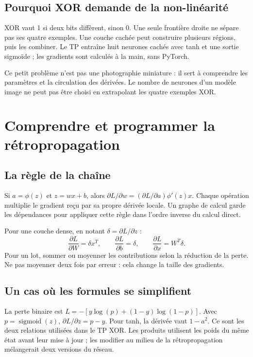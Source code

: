 \documentclass[12pt,a4paper,oneside]{report}
\begin{document}
\section{Pourquoi XOR demande de la non-linéarité}

XOR vaut 1 si deux bits diffèrent, sinon 0. Une seule frontière droite ne sépare
pas ses quatre exemples. Une couche cachée peut construire plusieurs régions,
puis les combiner. Le TP entraîne huit neurones cachés avec tanh et une sortie
sigmoïde ; les gradients sont calculés à la main, sans PyTorch.



Ce petit problème n'est pas une photographie miniature : il sert à comprendre
les paramètres et la circulation des dérivées. Le nombre de neurones d'un
modèle image ne peut pas être choisi en extrapolant les quatre exemples XOR.

\chapter{Comprendre et programmer la rétropropagation}

\section{La règle de la chaîne}

Si $a=\phi(z)$ et $z=wx+b$, alors
$\partial L/\partial w=(\partial L/\partial a)\phi'(z)x$.
Chaque opération multiplie le gradient reçu par sa propre dérivée locale.
Un graphe de calcul garde les dépendances pour appliquer cette règle dans
l'ordre inverse du calcul direct.

Pour une couche dense, en notant $\delta=\partial L/\partial z$ :
\[
 \frac{\partial L}{\partial W}=\delta x^T,\qquad
 \frac{\partial L}{\partial b}=\delta,\qquad
 \frac{\partial L}{\partial x}=W^T\delta.
\]
Pour un lot, sommer ou moyenner les contributions selon la réduction de la perte.
Ne pas moyenner deux fois par erreur : cela change la taille des gradients.

\section{Un cas où les formules se simplifient}

La perte binaire est
$L=-[y\log(p)+(1-y)\log(1-p)]$. Avec $p=\operatorname{sigmoid}(z)$,
$\partial L/\partial z=p-y$. Pour tanh, la dérivée vaut $1-a^2$.
Ce sont les deux relations utilisées dans le TP XOR. Les produits utilisent
les poids du même état avant leur mise à jour ; les modifier au milieu de
la rétropropagation mélangerait deux versions du réseau.
\end{document}

